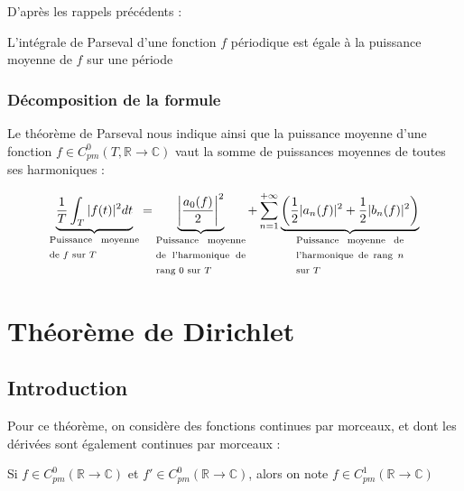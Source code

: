 \documentclass[12pt, a4paper]{article}
\begin{document}
D'après les rappels précédents :

\begin{tcolorbox}
	L'intégrale de Parseval d'une fonction $f$ périodique est égale à la puissance moyenne de $f$ sur une période
\end{tcolorbox}

\subsubsection{Décomposition de la formule}


\begin{tcolorbox}
	Le théorème de Parseval nous indique ainsi que la puissance moyenne d'une fonction $f \in C_{pm}^0(T, \mathbb{R} \to \mathbb{C})$ vaut la somme de puissances moyennes de toutes ses harmoniques :

	\begin{equation*}
		\underbrace{ \frac{1}{T} \int_T |f(t)|^2 dt }_{\text{\parbox{2,5cm}{Puissance moyenne de $f$ sur $T$}}} = \underbrace{ \left|\frac{a_0(f)}{2}\right|^2}_{\text{\parbox{2,5cm}{Puissance moyenne de l'harmonique de rang $0$ sur $T$}}} + \sum_{n=1}^{+\infty} \underbrace{\left( \frac{1}{2}|a_n(f)|^2 + \frac{1}{2}|b_n(f)|^2 \right)}_{\text{\parbox{3cm}{Puissance moyenne de l'harmonique de rang $n$ sur $T$}}}
	\end{equation*}
\end{tcolorbox}

\section{Théorème de Dirichlet}

\subsection{Introduction}

Pour ce théorème, on considère des fonctions continues par morceaux, et dont les dérivées sont également continues par morceaux :

\begin{tcolorbox}
	Si $f \in C_{pm}^0(\mathbb{R} \to \mathbb{C})$ et $f' \in C_{pm}^0(\mathbb{R} \to \mathbb{C})$, alors on note $f \in C_{pm}^1(\mathbb{R} \to \mathbb{C})$
\end{tcolorbox}
\end{document}
